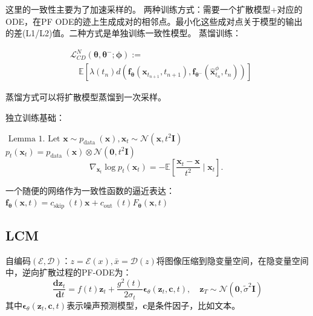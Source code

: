 这里的一致性主要为了加速采样的。
两种训练方式：需要一个扩散模型+对应的ODE，在PF ODE的迹上生成成对的相邻点。最小化这些成对点关于模型的输出的差(L1/L2)值。二种方式是单独训练一致性模型。
蒸馏训练：

$$\begin{aligned} & \mathcal{L}_{C D}^N\left(\boldsymbol{\theta}, \boldsymbol{\theta}^{-} ; \boldsymbol{\phi}\right):= \\ & \quad \mathbb{E}\left[\lambda\left(t_n\right) d\left(\boldsymbol{f}_{\boldsymbol{\theta}}\left(\mathbf{x}_{t_{n+1}}, t_{n+1}\right), \boldsymbol{f}_{\boldsymbol{\theta}^{-}}\left(\hat{\mathbf{x}}_{t_n}^\phi, t_n\right)\right)\right]\end{aligned}$$

蒸馏方式可以将扩散模型蒸馏到一次采样。

独立训练基础：

$\text { Lemma 1. Let } \mathbf{x} \sim p_{\text {data }}(\mathbf{x}), \mathbf{x}_t \sim \mathcal{N}\left(\mathbf{x}, t^2 \boldsymbol{I}\right)$   $p_t\left(\mathbf{x}_t\right)=p_{\text {data }}(\mathbf{x}) \otimes \mathcal{N}\left(\mathbf{0}, t^2 \boldsymbol{I}\right) $  
\begin{equation} 
  \nabla_{\mathbf x_t}\log p_t(\mathbf{x}_t)=-\mathbb{E}\left[\frac{\mathbf{x}_t-\mathbf{x}}{t^2} \mid \mathbf{x}_t\right] \text {. }
\end{equation}

一个随便的网络作为一致性函数的逼近表达：
$\boldsymbol{f}_{\boldsymbol{\theta}}(\mathbf{x}, t)=c_{\text {skip }}(t) \mathbf{x}+c_{\text {out }}(t) F_{\boldsymbol{\theta}}(\mathbf{x}, t)$

\subsection{LCM}
自编码$(\mathcal{E}, \mathcal{D})$：$z=\mathcal{E}(x), \bar{x}=\mathcal{D}(z)$将图像压缩到隐变量空间，在隐变量空间中，逆向扩散过程的PF-ODE为：
\begin{equation}
\frac{\mathbf{d} \boldsymbol{z}_t}{\mathbf{~d} t}=f(t) \boldsymbol{z}_t+\frac{g^2(t)}{2 \sigma_t} \boldsymbol{\epsilon}_\theta\left(\boldsymbol{z}_t, \boldsymbol{c}, t\right), \quad \boldsymbol{z}_T \sim \mathcal{N}\left(\mathbf{0}, \tilde{\sigma}^2 \boldsymbol{I}\right)
\end{equation}
其中$\boldsymbol{\epsilon}_\theta\left(\boldsymbol{z}_t, \boldsymbol{c}, t\right)$表示噪声预测模型，$\boldsymbol{c}$是条件因子，比如文本。

